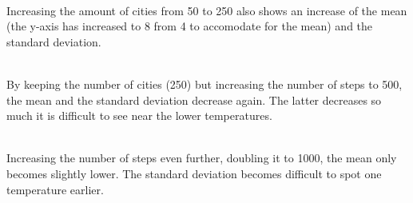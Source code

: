 \documentclass[10pt,a4paper]{article}
\begin{document}
 \\
Increasing the amount of cities from 50 to 250 also shows an increase of the mean (the y-axis has increased to 8 from 4 to accomodate for the mean) and the standard deviation.

 \\
By keeping the number of cities (250) but increasing the number of steps to 500, the mean and the standard deviation decrease again. The latter decreases so much it is difficult to see near the lower temperatures.

 \\
Increasing the number of steps even further, doubling it to 1000, the mean only becomes slightly lower. The standard deviation becomes difficult to spot one temperature earlier.
\end{document}

